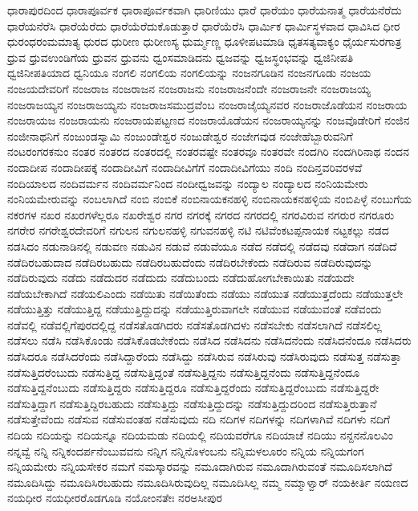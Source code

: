 {ಧಾರಾಪುರದಿಂದ
ಧಾರಾಪೂರ್ವಕ
ಧಾರಾಪೂರ್ವಕವಾಗಿ
ಧಾರಿಣಿಯು
ಧಾರೆ
ಧಾರೆಯಂ
ಧಾರೆಯನಾತ್ಮ
ಧಾರೆಯನೆರೆದು
ಧಾರೆಯನೆರೆಸಿ
ಧಾರೆಯೆರೆದು
ಧಾರೆಯೆರೆದುಕೊಡುತ್ತಾರೆ
ಧಾರೆಯೆರೆಸಿ
ಧಾರ್ಮಿಕ
ಧಾರ್ಮಿಸ್ಥಳವಾದ
ಧಾವಿಸಿದ
ಧೀರ
ಧುರಂಧರಂಮಮಾತ್ಯ
ಧುರದ
ಧುರೀಣ
ಧುರೀಣಸ್ಯ
ಧುರ್ಮ್ಮಣ್ಣ
ಧೂಳೀಪಟಮಾಡಿ
ಧೃತಸತ್ಯವಾಕ್ಯಂ
ಧೈರ್ಯಸುರಗಾತ್ರ
ಧ್ರುವ
ಧ್ರುವಉಂಡಿಗೆಯ
ಧ್ರುವನ
ಧ್ರುವನು
ಧ್ವಂಸಮಾಡಿದನು
ಧ್ವಜವನ್ನು
ಧ್ವಜಸ್ಥಂಭವನ್ನು
ಧ್ವಜಿನೀಪತಿ
ಧ್ವಜಿನೀಪತಿಯಾದ
ಧ್ವನಿಯೂ
ನಂಗಲಿ
ನಂಗಲಿಯ
ನಂಗಲಿಯನ್ನು
ನಂಜನಗೂಡಿನ
ನಂಜನಗೂಡು
ನಂಜಯ
ನಂಜಯದೇವರಿಗೆ
ನಂಜರಾಜ
ನಂಜರಾಜನ
ನಂಜರಾಜನು
ನಂಜರಾಜನೆಂದೇ
ನಂಜರಾಜನೇ
ನಂಜರಾಜಯ್ಯ
ನಂಜರಾಜಯ್ಯನ
ನಂಜರಾಜಯ್ಯನು
ನಂಜರಾಜಸಮುದ್ರವೆಂಬ
ನಂಜರಾಜೈಯ್ಯನವರ
ನಂಜರಾಜೊಡೆಯನ
ನಂಜರಾಯ
ನಂಜರಾಯಜ
ನಂಜರಾಯನು
ನಂಜರಾಯಪಟ್ಟಣದ
ನಂಜರಾಯೊಡೆಯನ
ನಂಜರಾಯ್ಯನನ್ನು
ನಂಜವೊಡೇರಿಗೆ
ನಂಜಿನ
ನಂಜೀನಾಥನಿಗೆ
ನಂಜುಂಡಸ್ವಾಮಿ
ನಂಜುಂಡೇಶ್ವರ
ನಂಜುಡೇಶ್ವರ
ನಂಜೇಗವುಡ
ನಂಜೇಹೆಬ್ಬಾರುವನಿಗೆ
ನಂಟರಂಗರಕನುಂ
ನಂತರ
ನಂತರದ
ನಂತರದಲ್ಲಿ
ನಂತರವಷ್ಟೇ
ನಂತರವೂ
ನಂತರವೇ
ನಂದಗಿರಿ
ನಂದಗಿರಿನಾಥ
ನಂದನ
ನಂದಾದೀಪ
ನಂದಾದೀಪಕ್ಕೆ
ನಂದಾದೀವಿಗೆ
ನಂದಾದೀವಿಗೆಗೆ
ನಂದಾದೀವಿಗೆಯು
ನಂದಿ
ನಂದಿನ್ತವರಿವರಳವೆ
ನಂದಿಯಾಲದ
ನಂದಿವರ್ಮನ
ನಂದಿವರ್ಮನಿಂದ
ನಂದೀಧ್ವಜವನ್ನು
ನಂದ್ಯಾಲ
ನಂದ್ಯಾಲದ
ನಂನಿಯಮೇರು
ನಂನಿಯಮೇರುವನ್ನು
ನಂಬಲಾಗಿದೆ
ನಂಬಿ
ನಂಬಿಕೆ
ನಂಬಿನಾಯಕನಹಳ್ಳಿ
ನಂಬಿನಾಯಕನಹಳ್ಳಿಯ
ನಂಬಿಪಿಳ್ಳೆ
ನಂಬುಗೆಯ
ನಕರಗಳ
ನಖರ
ನಖರಗಳೆಲ್ಲರೂ
ನಖರೇಶ್ವರ
ನಗರ
ನಗರಕ್ಕೆ
ನಗರದ
ನಗರದಲ್ಲಿ
ನಗರವಿರುವ
ನಗರುರ
ನಗರೂರು
ನಗರೇರ
ನಗರೇಶ್ವರದೇವರಿಗೆ
ನಗುಲನ
ನಗುಲನಹಳ್ಳಿ
ನಗುವನಹಳ್ಳಿ
ನಟಿ
ನಟಿವೆಂಕಟಪ್ಪನಾಯಕ
ನಟ್ಟಕಲ್ಲು
ನಡದ
ನಡಸಿದಂ
ನಡುನಾಡಿನಲ್ಲಿ
ನಡುವಣ
ನಡುವಿನ
ನಡುವೆ
ನಡುವೆಯೂ
ನಡೆದ
ನಡೆದಲ್ಲಿ
ನಡೆದವು
ನಡೆದಾಗ
ನಡೆದಿದೆ
ನಡೆದಿರಬಹುದಾದ
ನಡೆದಿರಬಹುದು
ನಡೆದಿರಬಹುದೆಂದು
ನಡೆದಿರಬೇಕೆಂದು
ನಡೆದಿರುವ
ನಡೆದಿರುವುದನ್ನು
ನಡೆದಿರುವುದು
ನಡೆದು
ನಡೆದುದರ
ನಡೆದುದು
ನಡೆದುಬಂದು
ನಡೆದುಹೋಗಬೇಕಾಯಿತು
ನಡೆಯದೇ
ನಡೆಯಬೇಕಾಗಿದೆ
ನಡೆಯಲಿಎಂದು
ನಡೆಯಿತು
ನಡೆಯಿತೆಂದು
ನಡೆಯು
ನಡೆಯುತ
ನಡೆಯುತ್ತದೆಂದು
ನಡೆಯುತ್ತಲೇ
ನಡೆಯುತ್ತಿತ್ತು
ನಡೆಯುತ್ತಿದ್ದ
ನಡೆಯುತ್ತಿದ್ದುದನ್ನು
ನಡೆಯುತ್ತಿರುವಾಗಲೇ
ನಡೆಯುವ
ನಡೆಯುವಂತೆ
ನಡೆವಂದು
ನಡೆವಲ್ಲಿ
ನಡೆವಲ್ಲಿಗೆಪುರದಲ್ಲಿದ್ದ
ನಡೆಸತೊಡಗಿದರು
ನಡೆಸತೊಡಗಿದಳು
ನಡೆಸಬೇಕು
ನಡೆಸಲಾಗಿದೆ
ನಡೆಸಲಿಲ್ಲ
ನಡೆಸಲು
ನಡೆಸಿ
ನಡೆಸಿಕೊಂಡು
ನಡೆಸಿಕೊಡಬೇಕೆಂದು
ನಡೆಸಿದ
ನಡೆಸಿದನು
ನಡೆಸಿದನೆಂದು
ನಡೆಸಿದನೆಂದೂ
ನಡೆಸಿದರು
ನಡೆಸಿದರೂ
ನಡೆಸಿದರೆಂದು
ನಡೆಸಿದ್ದಾರೆಂದು
ನಡೆಸಿದ್ದು
ನಡೆಸಿರುವ
ನಡೆಸಿರುವು
ನಡೆಸಿರುವುದು
ನಡೆಸುತ್ತ
ನಡೆಸುತ್ತಾ
ನಡೆಸುತ್ತಿದರೆಂಬುದು
ನಡೆಸುತ್ತಿದ್ದ
ನಡೆಸುತ್ತಿದ್ದಂತೆ
ನಡೆಸುತ್ತಿದ್ದನು
ನಡೆಸುತ್ತಿದ್ದನೆಂದು
ನಡೆಸುತ್ತಿದ್ದನೆಂದೂ
ನಡೆಸುತ್ತಿದ್ದನೆಂಬುದು
ನಡೆಸುತ್ತಿದ್ದರು
ನಡೆಸುತ್ತಿದ್ದರೂ
ನಡೆಸುತ್ತಿದ್ದರೆಂದು
ನಡೆಸುತ್ತಿದ್ದರೆಂಬುದು
ನಡೆಸುತ್ತಿದ್ದರೇ
ನಡೆಸುತ್ತಿದ್ದಾಗ
ನಡೆಸುತ್ತಿದ್ದಿರಬಹುದು
ನಡೆಸುತ್ತಿದ್ದು
ನಡೆಸುತ್ತಿದ್ದುದನ್ನು
ನಡೆಸುತ್ತಿದ್ದುದರಿಂದ
ನಡೆಸುತ್ತಿರುತ್ತಾನೆ
ನಡೆಸುತ್ತೇವೆಂದು
ನಡೆಸುವ
ನಡೆಸುವಂತಹ
ನಡೆಸುವುದು
ನದಿ
ನದಿಗಳ
ನದಿಗಳನ್ನು
ನದಿಗಳಾಗಿವೆ
ನದಿಗಳು
ನದಿಗೆ
ನದಿಯ
ನದಿಯನ್ನು
ನದಿಯನ್ನೂ
ನದಿಯಮಡು
ನದಿಯಲ್ಲಿ
ನದಿಯವರೆಗೂ
ನದಿಯಾಚೆ
ನದಿಯು
ನನ್ದನನೊಲವಿಂ
ನನ್ನವ್ವೆ
ನನ್ನಿ
ನನ್ನಿಕಂದರ್ಪನೆಂಬುವವನು
ನನ್ನಿಗ
ನನ್ನಿನೊಳಂಬನು
ನನ್ನಿಮಳಲೂರಂ
ನನ್ನಿಯ
ನನ್ನಿಯಗಂಗ
ನನ್ನಿಯಮೇರು
ನನ್ನಿಯಸೇಕರ
ನಮಗೆ
ನಮಸ್ಕಾರವನ್ನು
ನಮೂದಾಗಿರುವ
ನಮೂದಾಗಿರುವಂತೆ
ನಮೂದಿಸಲಾಗಿದೆ
ನಮೂದಿಸಿದ್ದು
ನಮೂದಿಸಿರಬಹುದು
ನಮೂದಿಸಿರುವುದಿಲ್ಲ
ನಮೂದಿಸಿಲ್ಲ
ನಮ್ಮ
ನಮ್ಮಾಳ್ವಾರ್
ನಯಕೀರ್ತಿ
ನಯಣದ
ನಯಧೀರ
ನಯಧೀರರೊಡಗೂಡಿ
ನಯೋಂನತೇಃ
ನರಅಸೀಪುರ
}
